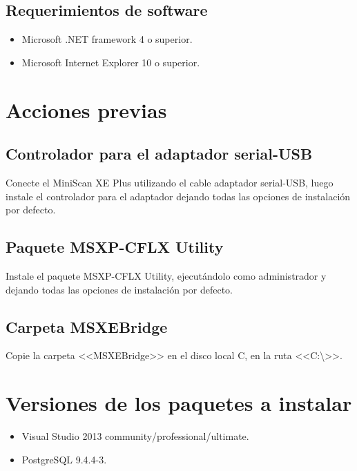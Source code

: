 \subsection{Requerimientos de software}

	\begin{itemize}
		\item Microsoft .NET framework 4 o superior.
		
		\item Microsoft Internet Explorer 10 o superior.
	\end{itemize}

\newpage

\section{Acciones previas}

	\subsection{Controlador para el adaptador serial-USB}
	
	Conecte el MiniScan XE Plus utilizando el cable adaptador serial-USB, luego instale el controlador para el adaptador dejando todas las opciones de instalaci\'{o}n por defecto.

	\subsection{Paquete MSXP-CFLX Utility}
	
	Instale el paquete MSXP-CFLX Utility, ejecut\'{a}ndolo como administrador y dejando todas las opciones de instalaci\'{o}n por defecto.
	
	\subsection{Carpeta MSXEBridge}
	
	Copie la carpeta <<MSXEBridge>> en el disco local C, en la ruta <<C:\textbackslash>>.
	
\section{Versiones de los paquetes a instalar}

\begin{itemize}
	\item Visual Studio 2013 community/professional/ultimate.
	
	\item PostgreSQL 9.4.4-3.
\end{itemize}

